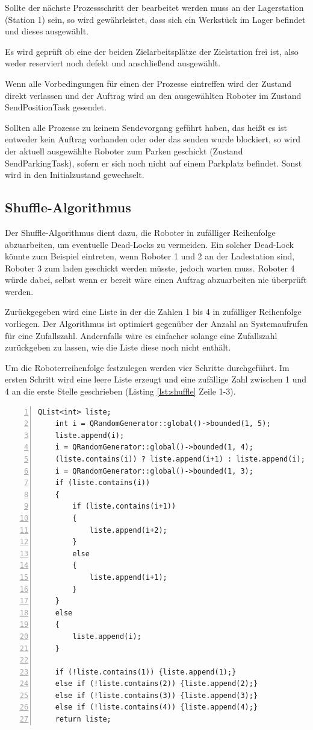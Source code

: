 Sollte der nächste Prozessschritt der bearbeitet werden muss an der Lagerstation (Station 1) sein, so wird gewährleistet, dass sich ein Werkstück im Lager befindet und dieses ausgewählt. 

Es wird geprüft ob eine der beiden Zielarbeitsplätze der Zielstation frei ist, also weder reserviert noch defekt und anschließend ausgewählt. 

Wenn alle Vorbedingungen für einen der Prozesse eintreffen wird der Zustand direkt verlassen und der Auftrag wird an den ausgewählten Roboter im Zustand SendPositionTask gesendet. 

Sollten alle Prozesse zu keinem Sendevorgang geführt haben, das heißt es ist entweder kein Auftrag vorhanden oder oder das senden wurde blockiert, so wird der aktuell ausgewählte Roboter zum Parken geschickt (Zustand SendParkingTask), sofern er sich noch nicht auf einem Parkplatz befindet. Sonst wird in den Initialzustand gewechselt.

\subsection{Shuffle-Algorithmus}
\label{sec:shuffle}

Der Shuffle-Algorithmus dient dazu, die Roboter in zufälliger Reihenfolge abzuarbeiten, um eventuelle Dead-Locks zu vermeiden. Ein solcher Dead-Lock könnte zum Beispiel eintreten, wenn Roboter 1 und 2 an der Ladestation sind, Roboter 3 zum laden geschickt werden müsste, jedoch warten muss. Roboter 4 würde dabei, selbst wenn er bereit wäre einen Auftrag abzuarbeiten nie überprüft werden.

Zurückgegeben wird eine Liste in der die Zahlen 1 bis 4 in zufälliger Reihenfolge vorliegen. Der Algorithmus ist optimiert gegenüber der Anzahl an Systemaufrufen für eine Zufallszahl. Andernfalls wäre es einfacher solange eine Zufallszahl zurückgeben zu lassen,  wie die Liste diese noch nicht enthält.

Um die Roboterreihenfolge festzulegen werden vier Schritte durchgeführt. Im ersten Schritt wird eine leere Liste erzeugt und eine zufällige Zahl zwischen 1 und 4 an die erste Stelle geschrieben (Listing \ref{lst:shuffle} Zeile 1-3). 

\begin{lstlisting}[frame=single, breaklines=true, numbers=left, stepnumber=2, firstnumber=1, numberstyle = \tiny, caption=Shuffle-Algorithmus,label=lst:shuffle]
    QList<int> liste;
    int i = QRandomGenerator::global()->bounded(1, 5);
    liste.append(i);
    i = QRandomGenerator::global()->bounded(1, 4);
    (liste.contains(i)) ? liste.append(i+1) : liste.append(i);
    i = QRandomGenerator::global()->bounded(1, 3);
    if (liste.contains(i))
    {
        if (liste.contains(i+1))
        {
            liste.append(i+2);
        }
        else
        {
            liste.append(i+1);
        }
    }
    else
    {
        liste.append(i);
    }

    if (!liste.contains(1)) {liste.append(1);}
    else if (!liste.contains(2)) {liste.append(2);}
    else if (!liste.contains(3)) {liste.append(3);}
    else if (!liste.contains(4)) {liste.append(4);}
    return liste;
\end{lstlisting}

